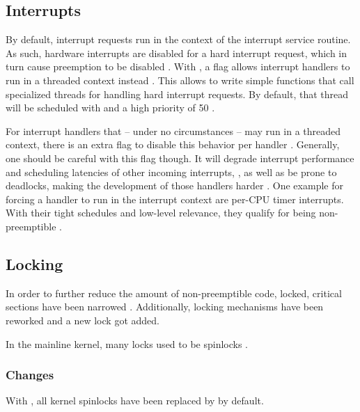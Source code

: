 \documentclass[10pt,twocolumn,a4paper]{article}
\begin{document}
\subsection{Interrupts}\label{subsec:interrupts}
By default, interrupt requests run in the context of the interrupt service routine.
As such, hardware interrupts are disabled for a hard interrupt request, which in turn cause preemption to be disabled \cite{lf:irq}.
With , a flag allows interrupt handlers to run in a threaded context instead \cite{reghenzani_realtime_2019, lf:irq}.
This allows to write simple functions that call specialized threads for handling hard interrupt requests\cite{reghenzani_realtime_2019}.
By default, that thread will be scheduled with  and a high priority of 50 \cite{lf:irq}.

For interrupt handlers that -- under no circumstances -- may run in a threaded context, there is an extra flag to disable this behavior per handler \cite{lf:irq}.
Generally, one should be careful with this flag though.
It will degrade interrupt performance and scheduling latencies of other incoming interrupts,  \cite{chyyuu_github_2017, mckenney_realtime_2005}, as well as be prone to deadlocks, making the development of those handlers harder \cite{mckenney_realtime_2005}.
One example for forcing a handler to run in the interrupt context are per-CPU timer interrupts.
With their tight schedules and low-level relevance, they qualify for being non-preemptible \cite{mckenney_realtime_2005}.

\subsection{Locking}\label{subsec:locking}
In order to further reduce the amount of non-preemptible code, locked, critical sections have been narrowed \cite{mckenney_realtime_2005}.
Additionally, locking mechanisms have been reworked and a new lock got added.

In the mainline kernel, many locks used to be spinlocks \cite{lf:sleeping-spinlocks}.

\subsubsection{Changes}
With , all  kernel spinlocks have been replaced by  by default.
\end{document}
